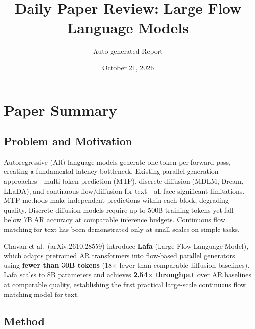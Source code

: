 \documentclass[11pt,a4paper]{article}
\title{Daily Paper Review: Large Flow Language Models}
\author{Auto-generated Report}
\date{October 21, 2026}
\begin{document}
\maketitle

\section{Paper Summary}

\subsection{Problem and Motivation}
Autoregressive (AR) language models generate one token per forward pass, creating a fundamental latency bottleneck. Existing parallel generation approaches---multi-token prediction (MTP), discrete diffusion (MDLM, Dream, LLaDA), and continuous flow/diffusion for text---all face significant limitations. MTP methods make independent predictions within each block, degrading quality. Discrete diffusion models require up to 500B training tokens yet fall below 7B AR accuracy at comparable inference budgets. Continuous flow matching for text has been demonstrated only at small scales on simple tasks.

Chavan et al.\ (arXiv:2610.28559) introduce \textbf{Lafa} (Large Flow Language Model), which adapts pretrained AR transformers into flow-based parallel generators using \textbf{fewer than 30B tokens} (18$\times$ fewer than comparable diffusion baselines). Lafa scales to 8B parameters and achieves \textbf{2.54$\times$ throughput} over AR baselines at comparable quality, establishing the first practical large-scale continuous flow matching model for text.

\subsection{Method}
\end{document}
